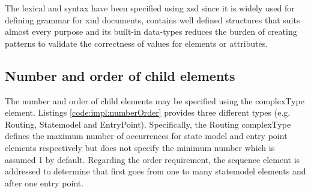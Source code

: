 

	The lexical and syntax have been specified using \gls{xsd} since it is widely used for defining grammar for \gls{xml} documents, contains well defined structures that suits almost every purpose and its built-in data-types reduces the burden of creating patterns to validate the correctness of values for elements or attributes.

	\subsection{Number and order of child elements}
		The number and order of child elements may be specified using the complexType element. Listings \ref{code:impl:numberOrder} provides three different types (e.g. Routing, Statemodel and EntryPoint). Specifically, the Routing complexType defines the maximum number of occurrences for state model and entry point elements respectively but does not specify the minimum number which is assumed 1 by default. Regarding the order requirement, the sequence element is addressed to determine that first goes from one to many statemodel elements and after one entry point.
		
